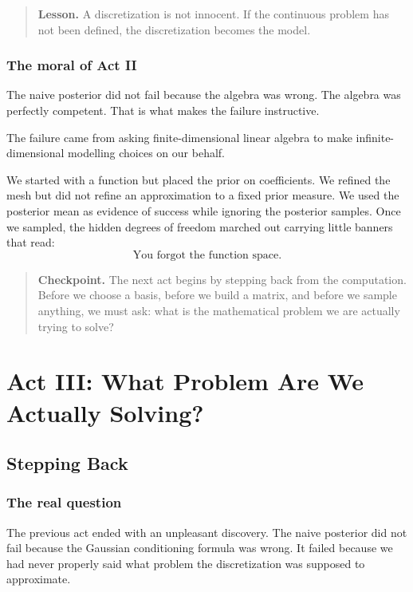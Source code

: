 \documentclass[11pt,a4paper]{book}
\newenvironment{lesson}
  {\begin{quote}\textbf{Lesson.}}
  {\end{quote}}
\newenvironment{checkpoint}
  {\begin{quote}\textbf{Checkpoint.}}
  {\end{quote}}
\begin{document}
\begin{lesson}
A discretization is not innocent.
If the continuous problem has not been defined, the discretization becomes the model.
\end{lesson}

\section{The moral of Act II}

The naive posterior did not fail because the algebra was wrong. The algebra was
perfectly competent. That is what makes the failure instructive.

The failure came from asking finite-dimensional linear algebra to make
infinite-dimensional modelling choices on our behalf.

We started with a function but placed the prior on coefficients. We refined the
mesh but did not refine an approximation to a fixed prior measure. We used the
posterior mean as evidence of success while ignoring the posterior samples. Once
we sampled, the hidden degrees of freedom marched out carrying little banners
that read:
\[
    \text{You forgot the function space.}
\]

\begin{checkpoint}
The next act begins by stepping back from the computation. Before we choose a
basis, before we build a matrix, and before we sample anything, we must ask:
what is the mathematical problem we are actually trying to solve?
\end{checkpoint}


\part{Act III: What Problem Are We Actually Solving?}

\chapter{Stepping Back}

\section{The real question}

The previous act ended with an unpleasant discovery. The naive posterior did
not fail because the Gaussian conditioning formula was wrong. It failed because
we had never properly said what problem the discretization was supposed to
approximate.
\end{document}
